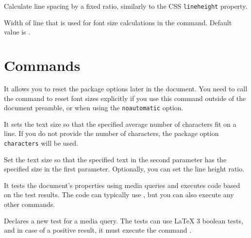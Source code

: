 \documentclass{ltxdoc}
\newcommand\StartDescribe[1]{%
  \par\medskip\noindent\DescribeMacro#1
}
\begin{document}
\noindent {} Calculate line spacing by a fixed ratio, similarly to the CSS \texttt{lineheight} property.

\noindent {} Width of line that is used for font size calculations in the \cmd{\setsizes} command. Default value is \cmd{\textwidth}.




\section{Commands}

\StartDescribe\ResponsiveSetup
\cmd\ResponsiveSetup{}

\noindent It allows you to reset the package options later in the document. You
need to call the \cmd{\setsizes} command to reset font sizes explicitly if you use this command
outside of the document preamble, or when using the \texttt{noautomatic} option.

\StartDescribe\setsizes
\cmd\setsizes{}

\noindent It sets the text size so that the specified average number of
characters fit on a line. If you do not provide the number of characters, the
package option \texttt{characters} will be used.


\StartDescribe\fonttobox
\cmd\fonttobox{}

\noindent Set the text size so that the specified text in the second parameter has
the specified size in the first parameter. Optionally, you can set the line
height ratio.

\StartDescribe\mediaquery
\cmd\mediaquery{}

\noindent
It tests the document's properties using media queries and executes code based on the test results.
The code can typically use \cmd\ResponsiveSetup, but you can also execute any other commands.

\StartDescribe\DeclareMediaQueryMatcher
\cmd\DeclareMediaQueryMatcher{}

\noindent Declares a new test for a media query. The tests can use LaTeX 3 boolean tests,
and in case of a positive result, it must execute the command 
\cmd\mediaquerytrue.

\StartDescribe\fixtextheight
\cmd\fixtextheight
\end{document}
